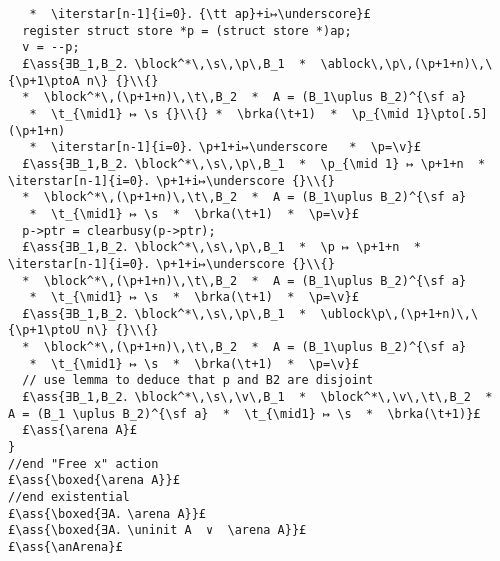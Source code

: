 \documentclass[12pt,a4paper]{article}
\makeatletter
\newcommand{\ml}[2][t]{\mbox{\mdseries\begin{tabular}[#1]{@{}L@{}}#2\end{tabular}}}
\newcommand{\ass}[1]{\ensuremath{{\color{blue}\left\{\ml[c]{#1}\right\}}}}
\newcommand{\iterstar}[2][]{\text{\LARGE $*$}^{#1}_{#2}}
\newcommand{\arena}{\mathop{\emph{arena}}}
\newcommand{\anArena}{\emph{anArena}}
\newcommand{\block}{\mathop{\emph{block}}}
\newcommand{\ublock}{\mathop{\emph{ublock}}}
\newcommand{\ablock}{\mathop{\emph{ablock}}}
\newcommand{\s}{{\tt s}}
\renewcommand{\t}{{\tt t}}
\newcommand{\p}{{\tt p}}
\renewcommand{\v}{{\tt v}}
\newcommand{\brka}{\mathop{\emph{brka}}}
\newcommand{\ptoU}{\mathbin{↦_{\sf u}}}
\newcommand{\ptoA}{\mathbin{↦_{\sf a}}}
\newcommand{\uninit}{\mathop{\emph{uninit}}}
\makeatother
\begin{document}
\begin{lstlisting}
   *  \iterstar[n-1]{i=0}．{\tt ap}+i↦\underscore}£
  register struct store *p = (struct store *)ap;
  v = --p;
  £\ass{∃B_1,B_2．\block^*\,\s\,\p\,B_1  *  \ablock\,\p\,(\p+1+n)\,\{\p+1\ptoA n\} {}\\{}
  *  \block^*\,(\p+1+n)\,\t\,B_2  *  A = (B_1\uplus B_2)^{\sf a}
   *  \t_{\mid1} ↦ \s {}\\{} *  \brka(\t+1)  *  \p_{\mid 1}\pto[.5](\p+1+n) 
   *  \iterstar[n-1]{i=0}．\p+1+i↦\underscore   *  \p=\v}£
  £\ass{∃B_1,B_2．\block^*\,\s\,\p\,B_1  *  \p_{\mid 1} ↦ \p+1+n  *  \iterstar[n-1]{i=0}．\p+1+i↦\underscore {}\\{}
  *  \block^*\,(\p+1+n)\,\t\,B_2  *  A = (B_1\uplus B_2)^{\sf a}
   *  \t_{\mid1} ↦ \s  *  \brka(\t+1)  *  \p=\v}£
  p->ptr = clearbusy(p->ptr);
  £\ass{∃B_1,B_2．\block^*\,\s\,\p\,B_1  *  \p ↦ \p+1+n  *  \iterstar[n-1]{i=0}．\p+1+i↦\underscore {}\\{}
  *  \block^*\,(\p+1+n)\,\t\,B_2  *  A = (B_1\uplus B_2)^{\sf a}
   *  \t_{\mid1} ↦ \s  *  \brka(\t+1)  *  \p=\v}£
  £\ass{∃B_1,B_2．\block^*\,\s\,\p\,B_1  *  \ublock\p\,(\p+1+n)\,\{\p+1\ptoU n\} {}\\{}
  *  \block^*\,(\p+1+n)\,\t\,B_2  *  A = (B_1\uplus B_2)^{\sf a}
   *  \t_{\mid1} ↦ \s  *  \brka(\t+1)  *  \p=\v}£
  // use lemma to deduce that p and B2 are disjoint
  £\ass{∃B_1,B_2．\block^*\,\s\,\v\,B_1  *  \block^*\,\v\,\t\,B_2  *  A = (B_1 \uplus B_2)^{\sf a}  *  \t_{\mid1} ↦ \s  *  \brka(\t+1)}£
  £\ass{\arena A}£
}
//end "Free x" action
£\ass{\boxed{\arena A}}£
//end existential
£\ass{\boxed{∃A．\arena A}}£
£\ass{\boxed{∃A．\uninit A  ∨  \arena A}}£
£\ass{\anArena}£
\end{lstlisting}\ \\
\end{document}
